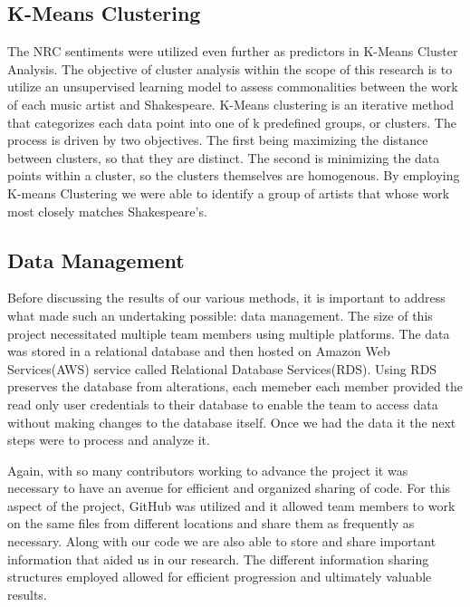 \documentclass[10pt,a4paper]{article}
\begin{document}
\subsection{K-Means Clustering}
The NRC sentiments were utilized even further as predictors in K-Means Cluster Analysis. The objective of cluster analysis within the scope of this research is to utilize an unsupervised learning model \cite{k-means} to assess commonalities between the work of each music artist and Shakespeare. K-Means clustering is an iterative method that categorizes each data point into one of k predefined groups, or clusters. The process is driven by two objectives. The first being maximizing the distance between clusters, so that they are distinct. The second is minimizing the data points within a cluster, so the clusters themselves are homogenous. \cite{k-means} By employing K-means Clustering we were able to identify a group of artists that whose work most closely matches Shakespeare’s. 

\subsection{Data Management}
Before discussing the results of our various methods, it is important to address what made such an undertaking possible: data management.  The size of this project necessitated multiple team members using multiple platforms. The data was stored in a relational database and then hosted on  Amazon Web Services(AWS) service called Relational Database Services(RDS). Using RDS preserves the database from alterations, each memeber each member provided the read only user credentials to their database to enable the team to access data without making changes to the database itself. Once we had the data it the next steps were to process and analyze it. 

\noindent Again, with so many contributors working to advance the project it was necessary to have an avenue for efficient and organized sharing of code. For this aspect of the project, GitHub was utilized and it allowed team members to work on the same files from different locations and share them as frequently as necessary. Along with our code we are also able to store and share important information that aided us in our research. The different information sharing structures employed allowed for efficient progression and ultimately valuable results. 

\end{document}
